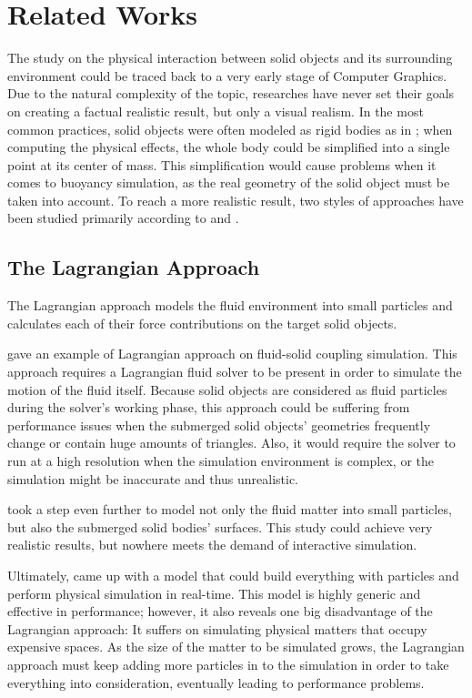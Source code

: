 \section{Related Works}

The study on the physical interaction between solid objects and its surrounding environment could be traced back to a very early stage of Computer Graphics.
Due to the natural complexity of the topic, researches have never set their goals on creating a factual realistic result, but only a visual realism.
In the most common practices, solid objects were often modeled as rigid bodies as in \cite{BAR01}; when computing the physical effects, the whole body could be simplified into a single point at its center of mass.
This simplification would cause problems when it comes to buoyancy simulation, as the real geometry of the solid object must be taken into account.
To reach a more realistic result, two styles of approaches have been studied primarily according to \cite{GOU09} and \cite{wang2024physics}.

\subsection{The Lagrangian Approach}

The Lagrangian approach models the fluid environment into small particles and calculates each of their force contributions on the target solid objects.

\cite{CAR04} gave an example of Lagrangian approach on fluid-solid coupling simulation.
This approach requires a Lagrangian fluid solver to be present in order to simulate the motion of the fluid itself.
Because solid objects are considered as fluid particles during the solver's working phase, this approach could be suffering from performance issues when the submerged solid objects' geometries frequently change or contain huge amounts of triangles.
Also, it would require the solver to run at a high resolution when the simulation environment is complex, or the simulation might be inaccurate and thus unrealistic.

\cite{AKI12} took a step even further to model not only the fluid matter into small particles, but also the submerged solid bodies' surfaces.
This study could achieve very realistic results, but nowhere meets the demand of interactive simulation.

Ultimately, \cite{macklin2014unified} came up with a model that could build everything with particles and perform physical simulation in real-time.
This model is highly generic and effective in performance;
however, it also reveals one big disadvantage of the Lagrangian approach:
It suffers on simulating physical matters that occupy expensive spaces.
As the size of the matter to be simulated grows, the Lagrangian approach must keep adding more particles in to the simulation in order to take everything into consideration, eventually leading to performance problems.

